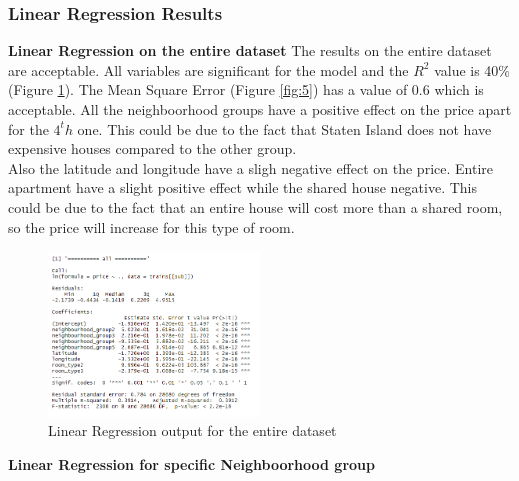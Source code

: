 \documentclass{FR16}
\begin{document}
\newpage
\subsubsection{Linear Regression Results}

\textbf{Linear Regression on the entire dataset}
\noindent The results on the entire dataset are acceptable. All variables are significant for the model and the $R^2$ value is 40\% (Figure \ref{fig:6}).
The Mean Square Error (Figure \ref{fig:5}) has a value of 0.6 which is acceptable. All the neighboorhood groups have a positive effect on the price apart for the $4^th$ one. This could be due to the fact that Staten Island does not have expensive houses compared to the other group. \\
Also the latitude and longitude have a sligh negative effect on the price. Entire apartment have a slight positive effect while the shared house negative. This could be due to the fact that an entire house will cost more than a shared room, so the price will increase for this type of room. 

\begin{figure}[H]
\centering
\includegraphics[width=0.5\textwidth]{figures/lm1.PNG} 
\caption{\label{fig:6} Linear Regression output for the entire dataset}
\end{figure}
\noindent
\textbf{Linear Regression for specific Neighboorhood group}
\end{document}
